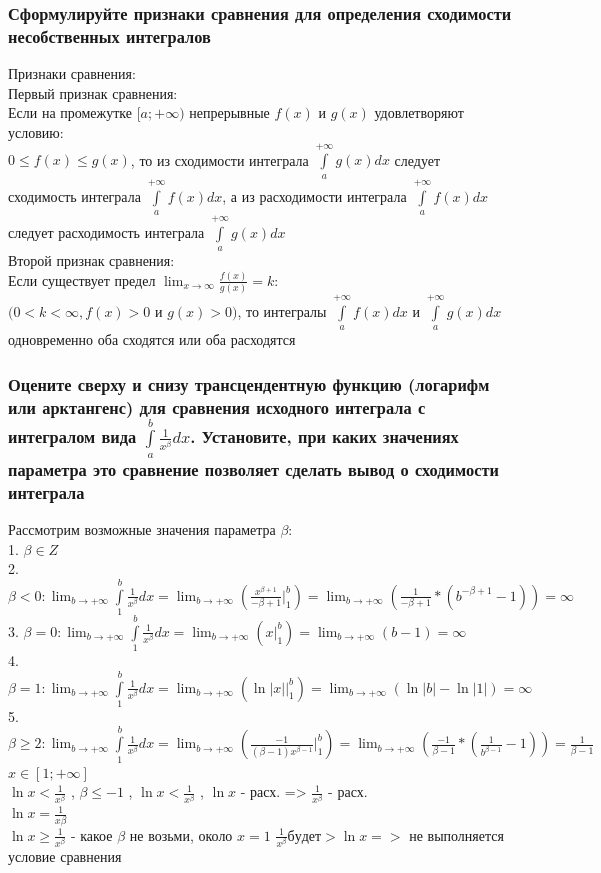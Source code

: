 \documentclass{article}
\begin{document}
\subsubsection{Сформулируйте признаки сравнения для определения сходимости несобственных интегралов}
Признаки сравнения:\\
Первый признак сравнения:\\
Если на промежутке $ [a; +\infty) $ непрерывные $ f(x) $ и $ g(x) $ удовлетворяют условию:\\
$ 0 \le f(x) \le g(x) $, то из сходимости интеграла $ \int\limits^{+\infty}_{a} g(x)dx $ следует сходимость интеграла $ \int\limits^{+\infty}_{a} f(x)dx $, а из расходимости интеграла $ \int\limits^{+\infty}_{a} f(x)dx $ следует расходимость интеграла $ \int\limits^{+\infty}_{a} g(x)dx $\\
Второй признак сравнения:\\
Если существует предел $ \lim_{x\to \infty} \frac{f(x)}{g(x)} = k $:\\
$ (0 < k < \infty, f(x) > 0 $ и $ g(x) > 0) $, то интегралы $ \int\limits^{+\infty}_{a} f(x)dx $ и $ \int\limits^{+\infty}_{a} g(x)dx $ одновременно оба сходятся или оба расходятся
\subsubsection{Оцените сверху и снизу трансцендентную функцию (логарифм или арктангенс) для сравнения исходного интеграла с интегралом вида $ \int\limits^b_a \frac{1}{x^{\beta}}dx $. Установите, при каких значениях параметра это сравнение позволяет сделать вывод о сходимости интеграла}
Рассмотрим возможные значения параметра $\beta$:\\
1. $ \beta \in Z $\\
2. $ \beta < 0 : \lim_{b \to +\infty} \int\limits^b_1 \frac{1}{x^{\beta}}dx = \lim_{b \to +\infty} (\frac{x^{\beta + 1}}{-\beta + 1} |^b_1) = \lim_{b \to +\infty} (\frac{1}{-\beta+1}*(b^{-\beta+1} - 1)) = \infty $\\
3. $ \beta = 0 : \lim_{b \to +\infty} \int\limits^b_1 \frac{1}{x^{\beta}}dx = \lim_{b \to +\infty} (x |^b_1) = \lim_{b \to +\infty} (b - 1) = \infty $\\
4. $ \beta = 1 : \lim_{b \to +\infty} \int\limits^b_1 \frac{1}{x^{\beta}}dx = \lim_{b \to +\infty} (\ln{|x| |^b_1}) = \lim_{b \to +\infty} (\ln{|b|} - \ln{|1|}) = \infty $\\
5. $ \beta \ge 2 : \lim_{b \to +\infty} \int\limits^b_1 \frac{1}{x^{\beta}}dx = \lim_{b \to +\infty} (\frac{-1}{(\beta - 1) x^{\beta - 1}} |^b_1) = \lim_{b \to +\infty} (\frac{-1}{\beta - 1} * (\frac{1}{b^{\beta - 1}} - 1)) = \frac{1}{\beta - 1} $\\
\small $ x \in [1; +\infty] $\\
\normalsize
$ \ln{x} < \frac{1}{x^\beta} $ , $ \beta \leq -1 $ , $ \ln{x} < \frac{1}{x^{\beta}} $ , $ \ln{x} $ - расх. => $ \frac{1}{x^{\beta}} $ - расх.\\
$ \ln{x} = \frac{1}{x{\beta}} $ \\
$ \ln{x} \ge \frac{1}{x^{\beta}} $ - какое $\beta$ не возьми, около $ x = 1 $ $ \frac{1}{x^{\beta}} будет > \ln{x} => $ не выполняется условие сравнения
\end{document}
